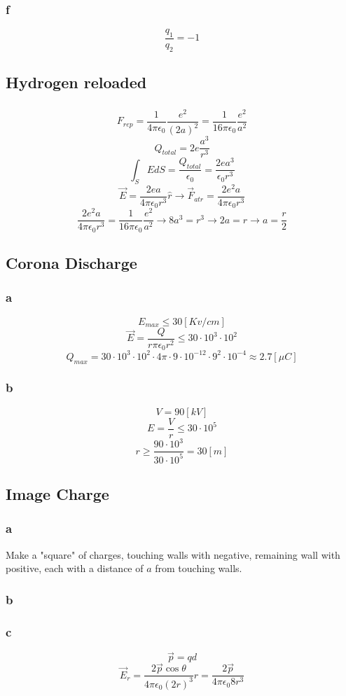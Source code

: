 \subsubsection{f}

\[
	\frac{q_1}{q_2} = -1
\]

\subsection{Hydrogen reloaded}

\subsubsection{}
\[
	F_{rep} = \frac{1}{4 \pi \epsilon_0} \frac{e^2}{(2 a)^2}
	= \frac{1}{16 \pi \epsilon_0} \frac{e^2}{a^2}
\]
\[
	Q_{total} = 2 e \frac{a^3}{r^3}
\]
\[
	\int_S E dS = \frac{Q_{total}}{\epsilon_0}
	= \frac{2 e a^3}{\epsilon_0 r^3}
\]
\[
	\vec{E} = \frac{2 e a}{4 \pi \epsilon_0 r^3} \hat{r}
	\to \vec{F}_{atr} = \frac{2 e^2 a}{4 \pi \epsilon_0 r^3}
\]
\[
	\frac{2 e^2 a}{4 \pi \epsilon_0 r^3}
	= \frac{1}{16 \pi \epsilon_0} \frac{e^2}{a^2}
	\to 8 a^3 = r^3
	\to 2 a = r
	\to a = \frac{r}{2}
\]

\subsection{Corona Discharge}

\subsubsection{a}

\[
	E_{max} \leq 30 [Kv/cm]
\]
\[
	\vec{E} = \frac{Q}{r \pi \epsilon_0 r^2} \leq 30 \cdot 10^3 \cdot 10^2
\]
\[
	Q_{max} = 30 \cdot 10^3 \cdot 10^2 \cdot 4 \pi \cdot 9 \cdot 10^{-12}
	\cdot 9^2 \cdot 10^{-4} \approx 2.7 [\mu C]
\]

\subsubsection{b}

\[
	V = 90 [kV]
\]
\[
	E = \frac{V}{r} \leq 30 \cdot 10^5
\]
\[
	r \geq \frac{90 \cdot 10^3}{30 \cdot 10^5} = 30 [m]
\]

\subsection{Image Charge}

\subsubsection{a}
Make a "square" of charges, touching walls with negative, remaining wall with
positive, each with a distance of \(a\) from touching walls.

\subsubsection{b}

\subsubsection{c}
\[
	\vec{p} = q d
\]
\[
	\vec{E}_r
	= \frac{2 \vec{p} \cos{\theta}}{4 \pi \epsilon_0 (2r)^3} \hat{r}
	= \frac{2 \vec{p}}{4 \pi \epsilon_0 8 r^3}
\]
